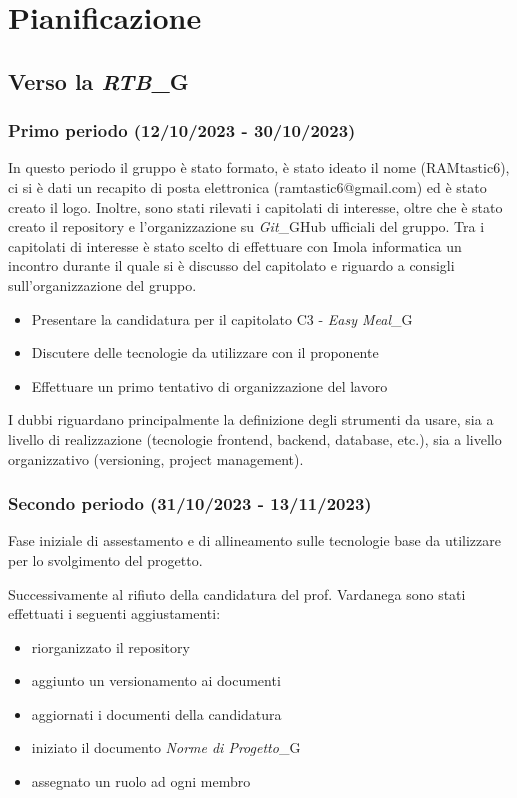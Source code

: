 \section{Pianificazione}
\subsection{Verso la \textit{RTB}_G}

\subsubsection{Primo periodo (12/10/2023 - 30/10/2023)}

In questo periodo il gruppo è stato formato, è stato ideato il nome (RAMtastic6), ci si è dati un recapito di posta elettronica (ramtastic6@gmail.com) ed è stato creato il logo. Inoltre, sono stati rilevati i capitolati di interesse, oltre che è stato creato il repository e l'organizzazione su \textit{Git}_GHub ufficiali del gruppo. Tra i capitolati di interesse è stato scelto di effettuare con Imola informatica un incontro durante il quale si è discusso del capitolato e riguardo a consigli sull'organizzazione del gruppo. 

\begin{itemize}
    \item Presentare la candidatura per il capitolato C3 - \textit{Easy Meal}_G
    \item Discutere delle tecnologie da utilizzare con il proponente
    \item Effettuare un primo tentativo di organizzazione del lavoro
\end{itemize}

I dubbi riguardano principalmente la definizione degli strumenti da usare, sia a livello di realizzazione (tecnologie frontend,
backend, database, etc.), sia a livello organizzativo (versioning, project management).

\subsubsection{Secondo periodo (31/10/2023 - 13/11/2023)}
Fase iniziale di assestamento e di allineamento sulle tecnologie base da utilizzare per lo svolgimento del progetto.

Successivamente al rifiuto della candidatura del prof. Vardanega sono stati effettuati i seguenti aggiustamenti:
\begin{itemize}
    \item riorganizzato il repository
    \item aggiunto un versionamento ai documenti
    \item aggiornati i documenti della candidatura
    \item iniziato il documento \textit{Norme di Progetto}_G
    \item assegnato un ruolo ad ogni membro
\end{itemize}

